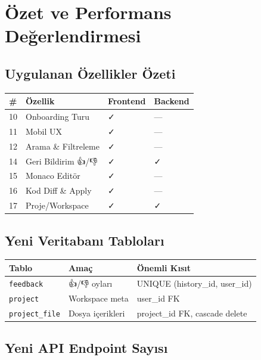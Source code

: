 \documentclass[12pt,a4paper]{article}
\begin{document}
\section{Özet ve Performans Değerlendirmesi}

\subsection{Uygulanan Özellikler Özeti}

\begin{tabularx}{\textwidth}{lXll}
\toprule
\textbf{\#} & \textbf{Özellik} & \textbf{Frontend} & \textbf{Backend} \\
\midrule
10 & Onboarding Turu       & \textcolor{green!60!black}{✓} & —  \\
11 & Mobil UX              & \textcolor{green!60!black}{✓} & —  \\
12 & Arama \& Filtreleme   & \textcolor{green!60!black}{✓} & —  \\
14 & Geri Bildirim 👍/👎   & \textcolor{green!60!black}{✓} & \textcolor{green!60!black}{✓} \\
15 & Monaco Editör         & \textcolor{green!60!black}{✓} & —  \\
16 & Kod Diff \& Apply     & \textcolor{green!60!black}{✓} & —  \\
17 & Proje/Workspace       & \textcolor{green!60!black}{✓} & \textcolor{green!60!black}{✓} \\
\bottomrule
\end{tabularx}

\subsection{Yeni Veritabanı Tabloları}

\begin{tabular}{lll}
\toprule
\textbf{Tablo} & \textbf{Amaç} & \textbf{Önemli Kısıt} \\
\midrule
\texttt{feedback}     & 👍/👎 oyları      & UNIQUE (history\_id, user\_id) \\
\texttt{project}      & Workspace meta    & user\_id FK \\
\texttt{project\_file} & Dosya içerikleri & project\_id FK, cascade delete \\
\bottomrule
\end{tabular}

\subsection{Yeni API Endpoint Sayısı}
\end{document}
